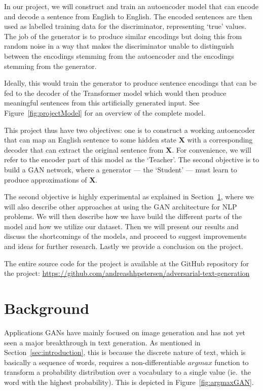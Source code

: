 \documentclass{article}
\begin{document}
In our project, we will construct and train an autoencoder model that can encode
and decode a sentence from English to English. The encoded sentences are then
used as labelled training data for the discriminator, representing `true'
values. The job of the generator is to produce similar encodings but doing this
from random noise in a way that makes the discriminator unable to distinguish
between the encodings stemming from the autoencoder and the encodings stemming
from the generator.

Ideally, this would train the generator to produce sentence encodings that can
be fed to the decoder of the Transformer model which would then produce
meaningful sentences from this artificially generated input. See
Figure~\ref{fig:projectModel} for an overview of the complete model.

This project thus have two objectives: one is to construct a working autoencoder
that can map an English sentence to some hidden state $\mathbf{X}$ with a
corresponding decoder that can extract the original sentence from $\mathbf{X}$.
For convenience, we will refer to the encoder part of this model as the
`Teacher'. The second objective is to build a GAN network, where a generator ---
the `Student' --- must learn to produce approximations of $\mathbf{X}$.

The second objective is highly experimental as explained in
Section~\ref{sec:background}, where we will also describe other approaches at
using the GAN architecture for NLP problems.  We will then describe how we have
build the different parts of the model and how we utilize our dataset.  Then we
will present our results and discuss the shortcomings of the model\(s\), and
proceed to suggest improvements and ideas for further research.  Lastly we
provide a conclusion on the project.

The entire source code for the project is available at the GitHub repository for
the project:
\url{https://github.com/andreashhpetersen/adversarial-text-generation}


\section{Background}\label{sec:background}

Applications GANs have mainly focused on image generation and has not yet seen a
major breakthrough in text generation. As mentioned in
Section~\ref{sec:introduction}, this is because the discrete nature of text,
which is basically a sequence of words, requires a non-differentiable $argmax$
function to transform a probability distribution over a vocabulary to a single
value (ie.\ the word with the highest probability). This is depicted in
Figure~\ref{fig:argmaxGAN}.
\end{document}
